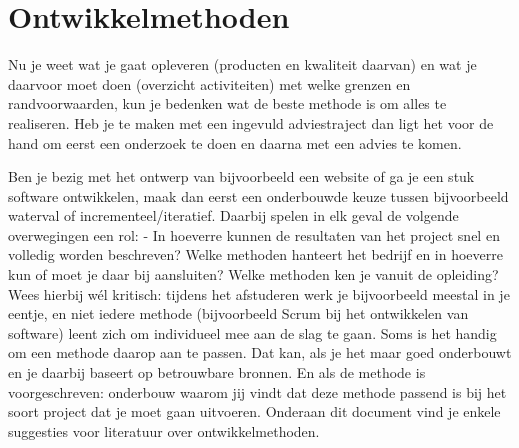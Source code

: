 \chapter{Ontwikkelmethoden}
Nu je weet wat je gaat opleveren (producten en kwaliteit daarvan) en wat je daarvoor moet doen (overzicht activiteiten) met welke grenzen en randvoorwaarden, kun je bedenken wat de beste methode is om alles te realiseren. Heb je te maken met een ingevuld adviestraject dan ligt het voor de hand om eerst een onderzoek te doen en daarna met een advies te komen.

Ben je bezig met het ontwerp van bijvoorbeeld een website of ga je een stuk software ontwikkelen, maak dan eerst een onderbouwde keuze tussen bijvoorbeeld waterval of incrementeel/iteratief. Daarbij spelen in elk geval de volgende overwegingen een rol:
- In hoeverre kunnen de resultaten van het project snel en volledig worden beschreven?
Welke methoden hanteert het bedrijf en in hoeverre kun of moet je daar bij aansluiten? 
Welke methoden ken je vanuit de opleiding?
Wees hierbij wél kritisch: tijdens het afstuderen werk je bijvoorbeeld meestal in je eentje, en niet iedere methode (bijvoorbeeld Scrum bij het ontwikkelen van software) leent zich om individueel mee aan de slag te gaan. Soms is het handig om een methode daarop aan te passen. Dat kan, als je het maar goed onderbouwt en je daarbij baseert op betrouwbare bronnen. En als de methode is voorgeschreven: onderbouw waarom jij vindt dat deze methode passend is bij het soort project dat je moet gaan uitvoeren. Onderaan dit document vind je enkele suggesties voor literatuur over ontwikkelmethoden.